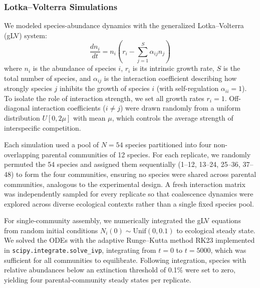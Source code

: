 \subsubsection*{Lotka--Volterra Simulations}
\label{sec:suppl:methods:simulations}

We modeled species-abundance dynamics with the generalized Lotka--Volterra (gLV) system:
\begin{equation}
\frac{dn_i}{dt} = n_i \left( r_i - \sum_{j=1}^{S} \alpha_{ij} n_j \right)
\label{eq:glv}
\end{equation}
where $n_i$ is the abundance of species $i$, $r_i$ is its intrinsic growth rate, $S$ is the total number of species, and $\alpha_{ij}$ is the interaction coefficient describing how strongly species $j$ inhibits the growth of species $i$ (with self-regulation $\alpha_{ii} = 1$). To isolate the role of interaction strength, we set all growth rates $r_i = 1$. Off-diagonal interaction coefficients ($i \neq j$) were drawn randomly from a uniform distribution $U[0, 2\mu]$ with mean $\mu$, which controls the average strength of interspecific competition.

Each simulation used a pool of $N = 54$ species partitioned into four non-overlapping parental communities of 12 species. For each replicate, we randomly permuted the 54 species and assigned them sequentially (1--12, 13--24, 25--36, 37--48) to form the four communities, ensuring no species were shared across parental communities, analogous to the experimental design. A fresh interaction matrix was independently sampled for every replicate so that coalescence dynamics were explored across diverse ecological contexts rather than a single fixed species pool.

For single-community assembly, we numerically integrated the gLV equations from random initial conditions $N_i(0) \sim \text{Unif}(0, 0.1)$ to ecological steady state. We solved the ODEs with the adaptive Runge--Kutta method RK23 implemented in \texttt{scipy.integrate.solve\_ivp}, integrating from $t = 0$ to $t = 5000$, which was sufficient for all communities to equilibrate. Following integration, species with relative abundances below an extinction threshold of 0.1\% were set to zero, yielding four parental-community steady states per replicate.

